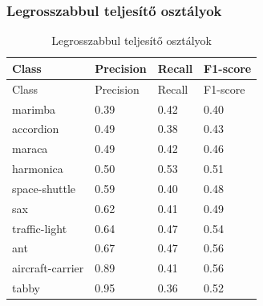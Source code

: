 \subsubsection{Legrosszabbul teljesítő osztályok}
  \begin{center}
    \begin{longtable}{llll}
    \caption{Legrosszabbul teljesítő osztályok}\label{tab:phase02_NASNet_legrosszabb_osztlyok}\\
    \toprule
    Class & Precision & Recall & F1-score \\
    \midrule
    \endfirsthead
    \toprule
    Class & Precision & Recall & F1-score \\
    \midrule
    \endhead
    marimba & 0.39 & 0.42 & 0.40 \\
    accordion & 0.49 & 0.38 & 0.43 \\
    maraca & 0.49 & 0.42 & 0.46 \\
    harmonica & 0.50 & 0.53 & 0.51 \\
    space-shuttle & 0.59 & 0.40 & 0.48 \\
    sax & 0.62 & 0.41 & 0.49 \\
    traffic-light & 0.64 & 0.47 & 0.54 \\
    ant & 0.67 & 0.47 & 0.56 \\
    aircraft-carrier & 0.89 & 0.41 & 0.56 \\
    tabby & 0.95 & 0.36 & 0.52 \\
    \bottomrule
    \end{longtable}
  \end{center}